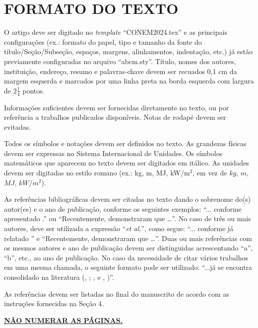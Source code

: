 \documentclass[10pt,fleqn,a4paper,twoside]{article}
\begin{document}
    \section{FORMATO DO TEXTO}
        
        O artigo deve ser digitado no \textit{template} ``CONEM2024.tex'' e as principais configurações (ex.: formato do papel, tipo e tamanho da fonte do título/Seção/Subseção, espaços, margens, alinhamentos, indentação, etc.) já estão previamente configuradas no arquivo ``abcm.sty''. Título, nomes dos autores, instituição, endereço, resumo e palavras-chave devem ser recuados 0,1 cm da margem esquerda e marcados por uma linha preta na borda esquerda com largura de 2$\frac{1}{4}$ pontos.
        
        Informações suficientes devem ser fornecidas diretamente no texto, ou por referência a trabalhos publicados disponíveis. Notas de rodapé devem ser evitadas. 
        
        Todos os símbolos e notações devem ser definidos no texto. As grandezas físicas devem ser expressas no Sistema Internacional de Unidades. Os símbolos matemáticos que aparecem no texto devem ser digitados em itálico. As unidades devem ser digitadas no estilo romano (ex.: kg, m, MJ, kW/m$^2$, em vez de $kg$, $m$, $MJ$, $kW/m^2$).
        
        As referências bibliográficas devem ser citadas no texto dando o sobrenome do(s) autor(es) e o ano de publicação, conforme os seguintes exemplos: ``... conforme apresentado \citep{MinwooShamim13}.'' ou ``Recentemente, \citet{MinwooShamim13} demonstraram que …''. No caso de três ou mais autores, deve ser utilizada a expressão ``\textit{et al.}'', como segue: ``... conforme já relatado \citep{Bordalo89}'' e ``Recentemente, \citet{Bordalo89} demonstraram que …''. Duas ou mais referências com os mesmos autores e ano de publicação devem ser distinguidas acrescentando ``a'', ``b'', etc., ao ano de publicação. No caso da necessidade de citar vários trabalhos em uma mesma chamada, o seguinte formato pode ser utilizado: ``...já se encontra consolidado na literatura (\citeauthor{Coimbra78}, \citeyear{Coimbra78}; \citeauthor{Clark86}, \citeyear{Clark86} e \citeauthor{Sparrow80},  \citeyear{Sparrow80})''.  
        
        As referências devem ser listadas no final do manuscrito de acordo com as instruções fornecidas na Seção 4.


        \textbf{\textcolor[rgb]{0.98,0.00,0.00}{\underline{NÃO NUMERAR AS PÁGINAS.}}}
\end{document}
